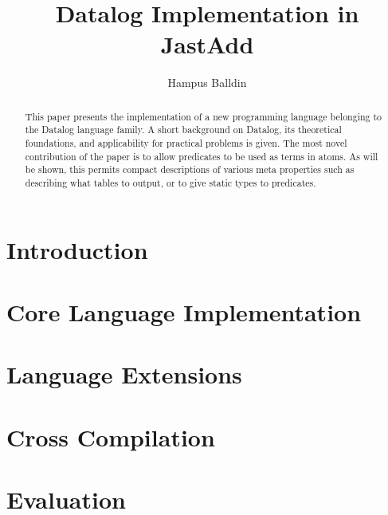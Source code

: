 \documentclass[sigplan,10pt]{acmart}
\begin{document}
\title[Short Title]{Datalog Implementation in JastAdd}         %



\author{Hampus Balldin}
\begin{abstract}
This paper presents the implementation of a new programming language belonging to the Datalog language family. A short background on Datalog, its theoretical foundations, and applicability for practical problems is given. The most novel contribution of the paper is to allow predicates to be used as terms in atoms. As will be shown, this permits compact descriptions of various meta properties such as describing what tables to output, or to give static types to predicates.
\end{abstract}
\maketitle
\section{Introduction}

\section{Core Language Implementation}

\section{Language Extensions}

\section{Cross Compilation}

\section{Evaluation}

\end{document}

